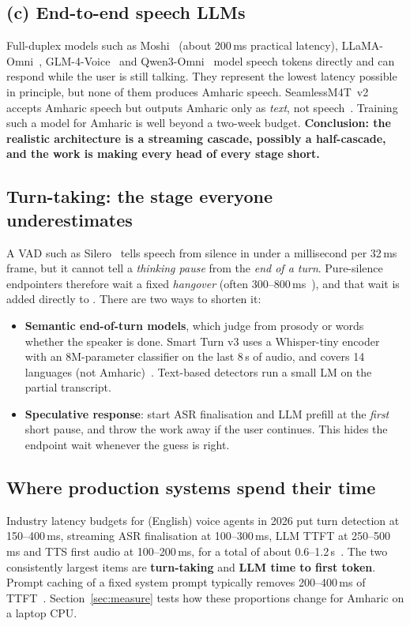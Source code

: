\subsection{(c) End-to-end speech LLMs}
Full-duplex models such as Moshi~\cite{moshi} (about 200\,ms practical latency),
LLaMA-Omni~\cite{llamaomni}, GLM-4-Voice~\cite{glm4voice} and Qwen3-Omni~\cite{qwen3omni} model
speech tokens directly and can respond while the user is still talking. They represent the lowest
latency possible in principle, but none of them produces Amharic speech. SeamlessM4T~v2 accepts
Amharic speech but outputs Amharic only as \emph{text}, not speech~\cite{seamless}. Training such a
model for Amharic is well beyond a two-week budget. \textbf{Conclusion: the realistic architecture is
a streaming cascade, possibly a half-cascade, and the work is making every head of every stage
short.}

\subsection{Turn-taking: the stage everyone underestimates}
\label{sec:how-turn}
A VAD such as Silero~\cite{silero} tells speech from silence in under a millisecond per 32\,ms
frame, but it cannot tell a \emph{thinking pause} from the \emph{end of a turn}. Pure-silence
endpointers therefore wait a fixed \emph{hangover} (often 300--800\,ms~\cite{webrtcventures2026}),
and that wait is added directly to \ttfa. There are two ways to shorten it:
\begin{itemize}
  \item \textbf{Semantic end-of-turn models}, which judge from prosody or words whether the speaker
  is done. Smart Turn v3 uses a Whisper-tiny encoder with an 8M-parameter classifier on the last 8\,s
  of audio, and covers 14 languages (not Amharic)~\cite{smartturn}. Text-based detectors run a small
  LM on the partial transcript.
  \item \textbf{Speculative response}: start ASR finalisation and LLM prefill at the \emph{first}
  short pause, and throw the work away if the user continues. This hides the endpoint wait whenever
  the guess is right.
\end{itemize}

\subsection{Where production systems spend their time}
Industry latency budgets for (English) voice agents in 2026 put turn detection at 150--400\,ms,
streaming ASR finalisation at 100--300\,ms, LLM TTFT at 250--500\,ms and TTS first audio at
100--200\,ms, for a total of about 0.6--1.2\,s~\cite{webrtcventures2026,deepgram2026}. The two
consistently largest items are \textbf{turn-taking} and \textbf{LLM time to first token}. Prompt
caching of a fixed system prompt typically removes 200--400\,ms of TTFT~\cite{webrtcventures2026}.
Section~\ref{sec:measure} tests how these proportions change for Amharic on a laptop CPU.
